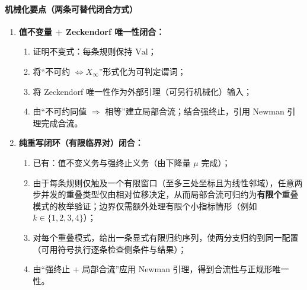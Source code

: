 \paragraph{机械化要点（两条可替代闭合方式）}
\begin{enumerate}
  \item \textbf{值不变量 + Zeckendorf 唯一性闭合：}
  \begin{enumerate}
    \item 证明不变式：每条规则保持 $\mathrm{Val}$；
    \item 将“不可约 $\Leftrightarrow X_\infty$”形式化为可判定谓词；
    \item 将 Zeckendorf 唯一性作为外部引理（可另行机械化）输入；
    \item 由“不可约同值 $\Rightarrow$ 相等”建立局部合流；结合强终止，引用 Newman 引理完成合流。
  \end{enumerate}
  \item \textbf{纯重写闭环（有限临界对）闭合：}
  \begin{enumerate}
    \item 已有：值不变义务与强终止义务（由下降量 $\mu$ 完成）；
    \item 由于每条规则仅触及一个有限窗口（至多三处坐标且为线性邻域），任意两步并发的重叠类型仅由相对位移决定，从而局部合流可归约为\textbf{有限个}重叠模式的枚举验证；边界仅需额外处理有限个小指标情形（例如 $k\in\{1,2,3,4\}$）；
    \item 对每个重叠模式，给出一条显式有限归约序列，使两分支归约到同一配置（可用符号执行逐条检查侧条件与结果）；
    \item 由“强终止 + 局部合流”应用 Newman 引理，得到合流性与正规形唯一性。
  \end{enumerate}
\end{enumerate}

